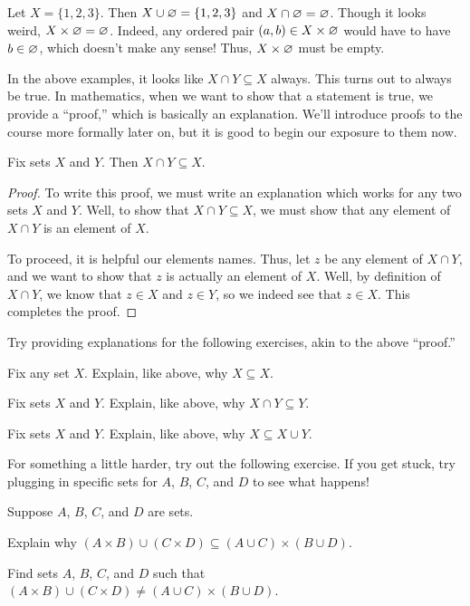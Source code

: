 \documentclass[../notes.tex]{subfiles}
\begin{document}
\begin{example}
    Let $X=\{1,2,3\}$. Then $X\cup\varnothing=\{1,2,3\}$ and $X\cap\varnothing=\varnothing$. Though it looks weird, $X\times\varnothing=\varnothing$. Indeed, any ordered pair $(a,b)\in X\times\varnothing$ would have to have $b\in\varnothing$, which doesn't make any sense! Thus, $X\times\varnothing$ must be empty.
\end{example}
In the above examples, it looks like $X\cap Y\subseteq X$ always. This turns out to always be true. In mathematics, when we want to show that a statement is true, we provide a ``proof,'' which is basically an explanation. We'll introduce proofs to the course more formally later on, but it is good to begin our exposure to them now.
\begin{proposition} \label{prop:intersection-subset}
    Fix sets $X$ and $Y$. Then $X\cap Y\subseteq X$.
\end{proposition}
\begin{proof}
    To write this proof, we must write an explanation which works for any two sets $X$ and $Y$. Well, to show that $X\cap Y\subseteq X$, we must show that any element of $X\cap Y$ is an element of $X$.

    To proceed, it is helpful our elements names. Thus, let $z$ be any element of $X\cap Y$, and we want to show that $z$ is actually an element of $X$. Well, by definition of $X\cap Y$, we know that $z\in X$ and $z\in Y$, so we indeed see that $z\in X$. This completes the proof.
\end{proof}
Try providing explanations for the following exercises, akin to the above ``proof.''
\begin{exercise}
    Fix any set $X$. Explain, like above, why $X\subseteq X$.
\end{exercise}
\begin{exercise}
    Fix sets $X$ and $Y$. Explain, like above, why $X\cap Y\subseteq Y$.
\end{exercise}
\begin{exercise}
    Fix sets $X$ and $Y$. Explain, like above, why $X\subseteq X\cup Y$.
\end{exercise}
For something a little harder, try out the following exercise. If you get stuck, try plugging in specific sets for $A$, $B$, $C$, and $D$ to see what happens!
\begin{exercise}
    Suppose $A$, $B$, $C$, and $D$ are sets.
    \begin{listalph}
        \item Explain why $(A\times B)\cup(C\times D)\subseteq(A\cup C)\times(B\cup D)$.
        \item Find sets $A$, $B$, $C$, and $D$ such that $(A\times B)\cup(C\times D)\ne(A\cup C)\times(B\cup D)$.
    \end{listalph}
\end{exercise}
\end{document}
